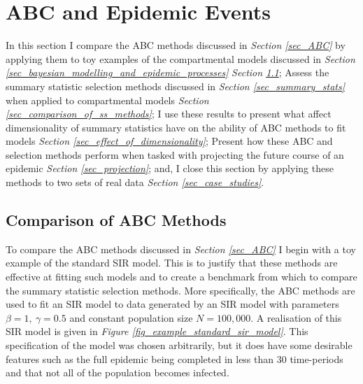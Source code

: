\documentclass[11pt,a4paper]{article}
\theoremstyle{break}
\begin{document}
\newpage
\section{ABC and Epidemic Events}\label{sec_abc_and_epidemic_events}

  \par In this section I compare the ABC methods discussed in \textit{Section \ref{sec_ABC}} by applying them to toy examples of the compartmental models discussed in \textit{Section \ref{sec_bayesian_modelling_and_epidemic_processes}} \textit{Section \ref{sec_comparison_of_abc_methods}}; Assess the summary statistic selection methods discussed in \textit{Section \ref{sec_summary_stats}} when applied to compartmental models \textit{Section \ref{sec_comparison_of_ss_methods}}; I use these results to present what affect dimensionality of summary statistics have on the ability of ABC methods to fit models \textit{Section \ref{sec_effect_of_dimensionality}}; Present how these ABC and selection methods perform when tasked with projecting the future course of an epidemic \textit{Section \ref{sec_projection}}; and, I close this section by applying these methods to two sets of real data \textit{Section \ref{sec_case_studies}}.



\subsection{Comparison of ABC Methods}\label{sec_comparison_of_abc_methods}

  \par To compare the ABC methods discussed in \textit{Section \ref{sec_ABC}} I begin with a toy example of the standard SIR model. This is to justify that these methods are effective at fitting such models and to create a benchmark from which to compare the summary statistic selection methods. More specifically, the ABC methods are used to fit an SIR model to data generated by an SIR model with parameters $\beta=1,\ \gamma=0.5$ and constant population size $N=100,000$. A realisation of this SIR model is given in \textit{Figure \ref{fig_example_standard_sir_model}}. This specification of the model was chosen arbitrarily, but it does have some desirable features such as the full epidemic being completed in less than 30 time-periods and that not all of the population becomes infected.
\end{document}
